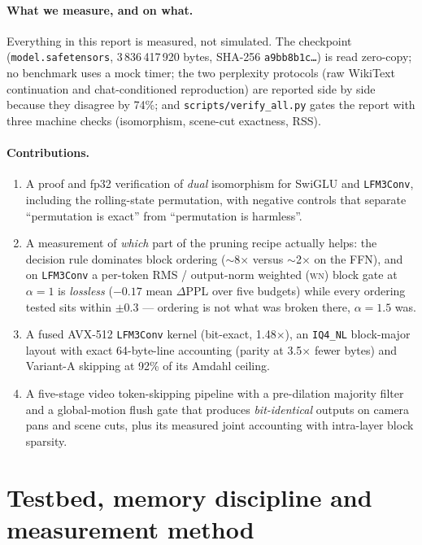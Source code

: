 \documentclass[11pt]{article}
\newcommand{\code}[1]{\texttt{\small #1}}
\newcommand{\wn}{\textsc{wn}}
\begin{document}
\paragraph{What we measure, and on what.} Everything in this report is measured, not
simulated. The checkpoint (\code{model.safetensors}, 3\,836\,417\,920 bytes, SHA-256
\code{a9bb8b1c\ldots}) is read zero-copy; no benchmark uses a mock timer; the two
perplexity protocols (raw WikiText continuation and chat-conditioned reproduction) are
reported side by side because they disagree by 74\%; and \code{scripts/verify\_all.py}
gates the report with three machine checks (isomorphism, scene-cut exactness, RSS).

\paragraph{Contributions.}
\begin{enumerate}
\item A proof and fp32 verification of \emph{dual} isomorphism for SwiGLU and
\code{LFM3Conv}, including the rolling-state permutation, with negative controls that
separate ``permutation is exact'' from ``permutation is harmless''.
\item A measurement of \emph{which} part of the pruning recipe actually helps: the decision
rule dominates block ordering ($\sim$8$\times$ versus $\sim$2$\times$ on the FFN), and on
\code{LFM3Conv} a per-token RMS / output-norm weighted (\wn) block gate at $\alpha{=}1$ is
\emph{lossless} ($-0.17$ mean $\Delta$PPL over five budgets) while every ordering tested
sits within $\pm0.3$ --- ordering is not what was broken there, $\alpha{=}1.5$ was.
\item A fused AVX-512 \code{LFM3Conv} kernel (bit-exact, 1.48$\times$), an
\code{IQ4\_NL} block-major layout with exact 64-byte-line accounting (parity at
3.5$\times$ fewer bytes) and Variant-A skipping at 92\% of its Amdahl ceiling.
\item A five-stage video token-skipping pipeline with a pre-dilation majority filter and a
global-motion flush gate that produces \emph{bit-identical} outputs on camera pans and
scene cuts, plus its measured joint accounting with intra-layer block sparsity.
\end{enumerate}

\section{Testbed, memory discipline and measurement method}
\end{document}
